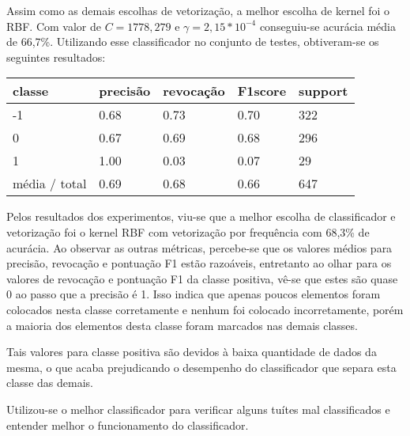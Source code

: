 Assim como as demais escolhas de vetorização, a melhor escolha de kernel foi o RBF.
Com valor de $C = 1778,279$ e $\gamma = 2,15*10^{-4}$ conseguiu-se acurácia média de 66,7\%.
Utilizando esse classificador no conjunto de testes, obtiveram-se os seguintes resultados:

\begin{table}[H]
	\centering
	\begin{tabular}{l | l | l | l | l}
		\hline
		classe  	&	precisão  &  revocação &  F1\-score &  support \\
		\hline
         -1   &    0.68  &    0.73   &   0.70   &    322 \\
         \hline
          0   &    0.67   &   0.69   &   0.68    &   296 \\
          \hline
          1   &    1.00   &   0.03   &   0.07    &    29 \\
		\hline
		média / total   &    0.69   &   0.68   &   0.66   &    647 \\
		\hline
	\end{tabular}
\end{table} 

Pelos resultados dos experimentos, viu-se que a melhor escolha de classificador e vetorização
foi o kernel RBF com vetorização por frequência com 68,3\% de acurácia. Ao observar as outras
métricas, percebe-se que os valores médios para precisão, revocação e pontuação F1 estão razoáveis,
entretanto ao olhar para os valores de revocação e pontuação F1 da classe positiva, vê-se
que estes são quase 0 ao passo que a precisão é 1. Isso indica que apenas poucos elementos foram
colocados nesta classe corretamente e nenhum foi colocado incorretamente, porém a maioria dos
elementos desta classe foram marcados nas demais classes.

Tais valores para classe positiva são devidos à baixa quantidade de dados da mesma, o que acaba
prejudicando o desempenho do classificador que separa esta classe das demais.

Utilizou-se o melhor classificador para verificar alguns tuítes mal classificados e entender melhor
o funcionamento do classificador.

